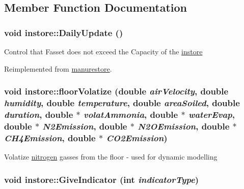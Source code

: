 \subsection{Member Function Documentation}
\hypertarget{classinstore_a3235daf3842bf6c4b1e30f56167e69c1}{
\subsubsection[{DailyUpdate}]{\setlength{\rightskip}{0pt plus 5cm}void instore::DailyUpdate ()}}
\label{classinstore_a3235daf3842bf6c4b1e30f56167e69c1}
Control that Fasset does not exceed the Capacity of the \hyperlink{classinstore}{instore} 

Reimplemented from \hyperlink{classmanurestore_a6eb8d6bedf9b0732423bfbb98d5da453}{manurestore}.\hypertarget{classinstore_a4a0d001c67c2611871505d71269a3fce}{
\subsubsection[{floorVolatize}]{\setlength{\rightskip}{0pt plus 5cm}void instore::floorVolatize (double {\em airVelocity}, \/  double {\em humidity}, \/  double {\em temperature}, \/  double {\em areaSoiled}, \/  double {\em duration}, \/  double $\ast$ {\em volatAmmonia}, \/  double $\ast$ {\em waterEvap}, \/  double $\ast$ {\em N2Emission}, \/  double $\ast$ {\em N2OEmission}, \/  double $\ast$ {\em CH4Emission}, \/  double $\ast$ {\em CO2Emission})}}
\label{classinstore_a4a0d001c67c2611871505d71269a3fce}
Volatize \hyperlink{classnitrogen}{nitrogen} gasses from the floor -\/ used for dynamic modelling \hypertarget{classinstore_afbd76ef97e35ef93c4945667e8341945}{
\subsubsection[{GiveIndicator}]{\setlength{\rightskip}{0pt plus 5cm}void instore::GiveIndicator (int {\em indicatorType})}}
\label{classinstore_afbd76ef97e35ef93c4945667e8341945}


